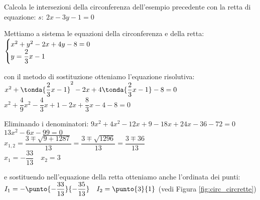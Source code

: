 \begin{esempio}
Calcola le intersezioni della circonferenza dell'esempio precedente con la 
retta di equazione: \(s:~2x -3y -1 = 0\)

Mettiamo a sistema le equazioni della circonferenza e della retta: \\
\(\begin{cases}x^2 +y^2 -2x +4y -8 = 0 \\ y = \dfrac{2}{3}x -1\end{cases}\) 

con il metodo di sostituzione otteniamo l'equazione risolutiva: \\
\(x^2 +\tonda{\dfrac{2}{3}x -1}^2 -2x +4\tonda{\dfrac{2}{3}x -1} -8 = 0\) \\
\(x^2 +\dfrac{4}{9}x^2 - \dfrac{4}{3}x +1 -2x +\dfrac{8}{3}x -4 -8 = 0\) 

Eliminando i denominatori:
\(9x^2 +4x^2 -12x +9 -18x +24x -36 -72 = 0\) \\
\(13x^2 -6x -99 = 0\) \\
\(x_{1,2} = \dfrac{3 \mp \sqrt{9 +1287}}{13} = 
            \dfrac{3 \mp \sqrt{1296}}{13} = 
            \dfrac{3 \mp 36}{13}\) \\
\(x_1 = -\dfrac{33}{13} \quad x_2 = 3\) 

e sostituendo nell'equazione della retta otteniamo anche l'ordinata dei 
punti: \\
\(I_1 = - \punto{-\dfrac{33}{13}}{-\dfrac{35}{13}} \quad I_2 = \punto{3}{1}\)
 (vedi Figura \ref{fig:circ_circrette})

\end{esempio}

